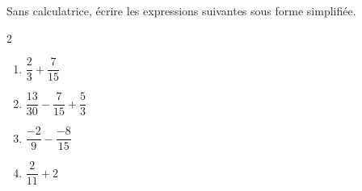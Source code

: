 \begin{exo}{}
	Sans calculatrice, écrire les expressions suivantes sous forme simplifiée.
	\vspace*{-2mm}\begin{multicols}{2}
		\begin{enumerate}[itemsep=2mm]
			\item $\dfrac{2}{3} + \dfrac{7}{15}$
			\item $\dfrac{13}{30} - \dfrac{7}{15} + \dfrac{5}{3}$
			\item $\dfrac{-2}{9} - \dfrac{-8}{15}$
			\item $\dfrac{2}{11} + 2$
		\end{enumerate}
	\end{multicols}\vspace*{-2mm}
\end{exo}
